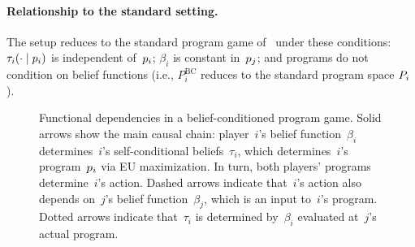 \documentclass[sigconf]{aamas}
\theoremstyle{definition}
\newcommand{\bcprogspacei}{P^{\mathrm{BC}}_i}
\begin{document}
\paragraph{Relationship to the standard setting.} The setup reduces to the standard program game of~\citet{digiovanni2024safe} under these conditions:  
$\tau_i(\cdot \mid p_i)$ is independent of~$p_i$; $\beta_i$ is constant in~$p_j$; and programs do not condition on belief functions (i.e., $\bcprogspacei$ reduces to the standard program space $P_i$).

\begin{figure}[t]
\centering
{}
\caption{Functional dependencies in a belief-conditioned program game.
Solid arrows show the main causal chain: player~$i$'s belief function~$\beta_i$ determines~$i$'s self-conditional beliefs~$\tau_i$,
which determines~$i$'s program~$p_i$ via EU maximization. In turn, both players' programs determine~$i$'s action.
Dashed arrows indicate that~$i$'s action also depends on~$j$'s belief function~$\beta_j$, which is an input to~$i$'s program.
Dotted arrows indicate that~$\tau_i$ is determined by~$\beta_i$ evaluated at~$j$'s actual program.}
\label{fig:bcpg}
\end{figure}
\end{document}

